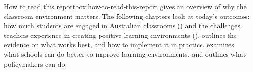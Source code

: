 \documentclass[FrontPage]{grattan}
\begin{document}

\begin{addsmallbox}{How to read this report}{box:how-to-read-this-report}
 gives an overview of why the classroom environment matters.
The following chapters look at today's outcomes: how much students are engaged in Australian classrooms () and the challenges teachers experience in creating positive learning environments ().  outlines the evidence on what works best, and how to implement it in practice.  examines what schools can do better to improve learning environments, and  outlines what policymakers can do.
\end{addsmallbox}
\end{document}
